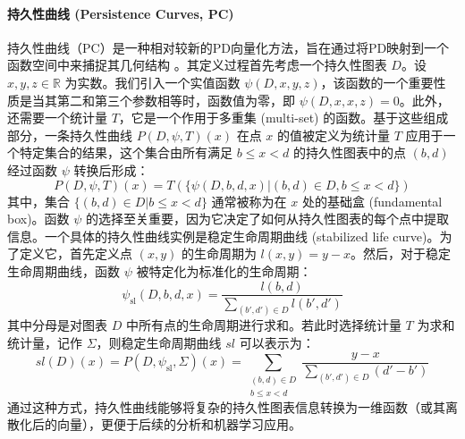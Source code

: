\paragraph{持久性曲线 (Persistence Curves, PC)}
\label{sec:feat_pc}
持久性曲线（PC）\cite{chung2020persistent}是一种相对较新的PD向量化方法，旨在通过将PD映射到一个函数空间中来捕捉其几何结构 。其定义过程首先考虑一个持久性图表 $D$。设 $x, y, z \in \mathbb{R}$ 为实数。我们引入一个实值函数 $\psi(D, x, y, z)$，该函数的一个重要性质是当其第二和第三个参数相等时，函数值为零，即 $\psi(D, x, x, z) = 0$。此外，还需要一个统计量 $T$，它是一个作用于多重集 (multi-set) 的函数。基于这些组成部分，一条持久性曲线 $P(D, \psi, T)(x)$ 在点 $x$ 的值被定义为统计量 $T$ 应用于一个特定集合的结果，这个集合由所有满足 $b \le x < d$ 的持久性图表中的点 $(b,d)$ 经过函数 $\psi$ 转换后形成：
\begin{equation}
    P(D, \psi, T)(x) = T \left( \{ \psi(D, b, d, x) | (b,d) \in D, b \le x < d \} \right)
\end{equation}
其中，集合 $\{ (b,d) \in D | b \le x < d \}$ 通常被称为在 $x$ 处的基础盒 (fundamental box)。函数 $\psi$ 的选择至关重要，因为它决定了如何从持久性图表的每个点中提取信息。一个具体的持久性曲线实例是稳定生命周期曲线 (stabilized life curve)。为了定义它，首先定义点 $(x,y)$ 的生命周期为 $l(x,y) = y-x$。然后，对于稳定生命周期曲线，函数 $\psi$ 被特定化为标准化的生命周期：
\begin{equation}
    \psi_{\text{sl}}(D, b, d, x) = \frac{l(b,d)}{\sum_{(b',d') \in D} l(b',d')}
\end{equation}
其中分母是对图表 $D$ 中所有点的生命周期进行求和。若此时选择统计量 $T$ 为求和统计量，记作 $\Sigma$，则稳定生命周期曲线 $sl$ 可以表示为：
\begin{equation}
    sl(D)(x) = P(D, \psi_{\text{sl}}, \Sigma)(x) = \sum_{\substack{(b,d) \in D \\ b \le x < d}} \frac{y-x}{\sum_{(b',d') \in D} (d'-b')}
\end{equation}
通过这种方式，持久性曲线能够将复杂的持久性图表信息转换为一维函数（或其离散化后的向量），更便于后续的分析和机器学习应用。
